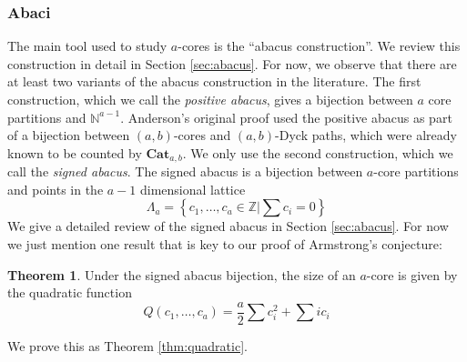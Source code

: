 \documentclass{amsart}[12pt]
\theoremstyle{definition}
\newtheorem{theorem}[dummy]{Theorem}
\newcommand{\Z}{\mathbb{Z}}
\newcommand{\N}{\mathbb{N}}
\newcommand{\Cat}{\mathbf{Cat}}
\begin{document}
\subsubsection{Abaci}
The main tool used to study $a$-cores is the ``abacus construction''. We review this construction in detail in Section \ref{sec:abacus}. For now, we observe that there are at least two variants of the abacus construction in the literature.
The first construction, which we call the \emph{positive abacus}, gives a bijection between $a$ core partitions and $\N^{a-1}$. Anderson's original proof used the positive abacus as part of a bijection between $(a,b)$-cores and $(a,b)$-Dyck paths, which were already known to be counted by $\Cat_{a,b}$.
We only use the second construction, which we call the \emph{signed abacus}. The signed abacus is a bijection between $a$-core partitions and points in the $a-1$ dimensional lattice
$$\Lambda_a=\left\{c_1,\dots,c_a\in\Z\Big |\sum c_i=0\right\}$$
We give a detailed review of the signed abacus in Section \ref{sec:abacus}. For now we just mention one result that is key to our proof of Armstrong's conjecture:
\begin{theorem}
Under the signed abacus bijection, the size of an $a$-core is given by the quadratic function
$$Q(c_1,\dots, c_a)=\frac{a}{2}\sum c_i^2+\sum ic_i$$
\end{theorem}
We prove this as Theorem \ref{thm:quadratic}.
\end{document}
